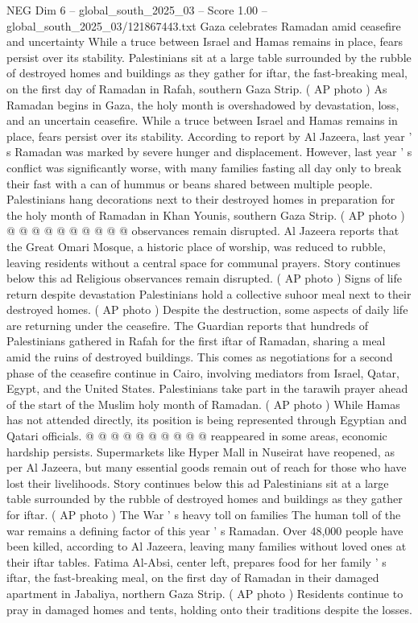 \begin{textsample}{NEG Dim 6 – global\_south\_2025\_03 – Score 1.00 – global\_south\_2025\_03/121867443.txt}  \label{ex:f6_neg_143}
Gaza celebrates Ramadan amid ceasefire and uncertainty While a truce between Israel and Hamas remains in place, fears persist over its stability.
Palestinians sit at a large table surrounded by the rubble of destroyed homes and buildings as they gather for iftar, the fast-breaking meal, on the first day of Ramadan in Rafah, southern Gaza Strip. ( AP photo ) As Ramadan begins in Gaza, the holy month is overshadowed by devastation, loss, and an uncertain ceasefire.
While a truce between Israel and Hamas remains in place, fears persist over its stability.
According to report by Al Jazeera, last year ' s Ramadan was marked by severe hunger and displacement.
However, last year ' s conflict was significantly worse, with many families fasting all day only to break their fast with a can of hummus or beans shared between multiple people.
Palestinians hang decorations next to their destroyed homes in preparation for the holy month of Ramadan in Khan Younis, southern Gaza Strip. ( AP photo ) @ @ @ @ @ @ @ @ @ @ observances remain disrupted.
Al Jazeera reports that the Great Omari Mosque, a historic place of worship, was reduced to rubble, leaving residents without a central space for communal prayers.
Story continues below this ad Religious observances remain disrupted. ( AP photo ) Signs of life return despite devastation Palestinians hold a collective suhoor meal next to their destroyed homes. ( AP photo ) Despite the destruction, some aspects of daily life are returning under the ceasefire.
The Guardian reports that hundreds of Palestinians gathered in Rafah for the first iftar of Ramadan, sharing a meal amid the ruins of destroyed buildings.
This comes as negotiations for a second phase of the ceasefire continue in Cairo, involving mediators from Israel, Qatar, Egypt, and the United States.
Palestinians take part in the tarawih prayer ahead of the start of the Muslim holy month of Ramadan. ( AP photo ) While Hamas has not attended directly, its position is being represented through Egyptian and Qatari officials. @ @ @ @ @ @ @ @ @ @ reappeared in some areas, economic hardship persists.
Supermarkets like Hyper Mall in Nuseirat have reopened, as per Al Jazeera, but many essential goods remain out of reach for those who have lost their livelihoods.
Story continues below this ad Palestinians sit at a large table surrounded by the rubble of destroyed homes and buildings as they gather for iftar. ( AP photo ) The War ' s heavy toll on families The human toll of the war remains a defining factor of this year ' s Ramadan.
Over 48,000 people have been killed, according to Al Jazeera, leaving many families without loved ones at their iftar tables.
Fatima Al-Absi, center left, prepares food for her family ' s iftar, the fast-breaking meal, on the first day of Ramadan in their damaged apartment in Jabaliya, northern Gaza Strip. ( AP photo ) Residents continue to pray in damaged homes and tents, holding onto their traditions despite the losses.

\end{textsample}
